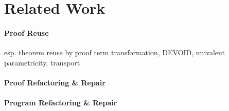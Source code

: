 \section{Related Work}

\paragraph{Proof Reuse}

esp. theorem reuse by proof term transformation, DEVOID, univalent parametricity, transport

\paragraph{Proof Refactoring \& Repair}

\paragraph{Program Refactoring \& Repair}
